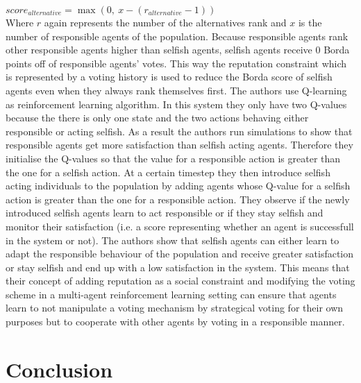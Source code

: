 \documentclass[conference]{IEEEtran}
\begin{document}
$score_{alternative}=\max(0,\ x-(r_{alternative}-1))$\\
Where $r$ again represents the number of the alternatives rank and $x$ is the number of responsible agents of the population. Because responsible agents rank other responsible agents higher than selfish agents, selfish agents receive $0$ Borda points off of responsible agents' votes. This way the reputation constraint which is represented by a voting history is used to reduce the Borda score of selfish agents even when they always rank themselves first.
\newline
The authors use Q-learning as reinforcement learning algorithm. In this system they only have two Q-values because the there is only one state and the two actions behaving either responsible or acting selfish.
As a result the authors run simulations to show that responsible agents get more satisfaction than selfish acting agents. Therefore they initialise the Q-values so that the value for a responsible action is greater than the one for a selfish action. At a certain timestep they then introduce selfish acting individuals to the population by adding agents whose Q-value for a selfish action is greater than the one for a responsible action. They observe if the newly introduced selfish agents learn to act responsible or if they stay selfish and monitor their satisfaction (i.e. a score representing whether an agent is successfull in the system or not).
\newline
The authors show that selfish agents can either learn to adapt the responsible behaviour of the population and receive greater satisfaction or stay selfish and end up with a low satisfaction in the system. This means that their concept of adding reputation as a social constraint and modifying the voting scheme in a multi-agent reinforcement learning setting can ensure that agents learn to not manipulate a voting mechanism by strategical voting for their own purposes but to cooperate with other agents by voting in a responsible manner.

\section{Conclusion}\label{4Conclusion}





\vspace{12pt}
\end{document}
